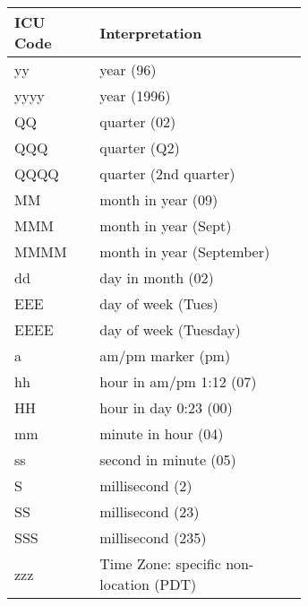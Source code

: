 \begin{table}[ht]
\centering
\bgroup
\def\arraystretch{1.5}
\begin{tabular}{|p{0.15\linewidth}| p{0.5\linewidth}|}
\hline
\textbf{ICU Code} & \textbf{Interpretation}\\ \hline

\scriptsize{yy} & \scriptsize{year (96)}\\ \hline
\scriptsize{yyyy} & \scriptsize{year (1996)}\\ \hline
    
\scriptsize{QQ} & \scriptsize{quarter (02)}\\ \hline
\scriptsize{QQQ} & \scriptsize{quarter (Q2)}\\ \hline
\scriptsize{QQQQ} & \scriptsize{quarter (2nd quarter)}\\ \hline
    
\scriptsize{MM} & \scriptsize{month in year (09)}\\ \hline
\scriptsize{MMM} & \scriptsize{month in year (Sept)}\\ \hline
\scriptsize{MMMM} & \scriptsize{month in year (September)}\\ \hline
    
\scriptsize{dd} & \scriptsize{day in month (02)}\\ \hline
    
\scriptsize{EEE} & \scriptsize{day of week (Tues)}\\ \hline
\scriptsize{EEEE} & \scriptsize{day of week (Tuesday)}\\ \hline
    
\scriptsize{a} & \scriptsize{am/pm marker (pm)}\\ \hline
    
\scriptsize{hh} & \scriptsize{hour in am/pm 1:12 (07)}\\ \hline
\scriptsize{HH} & \scriptsize{hour in day 0:23 (00)}\\ \hline
\scriptsize{mm} & \scriptsize{minute in hour (04)}\\ \hline
\scriptsize{ss} & \scriptsize{second in minute (05)}\\ \hline
    
\scriptsize{S} & \scriptsize{millisecond (2)}\\ \hline
\scriptsize{SS} & \scriptsize{millisecond (23)}\\ \hline
\scriptsize{SSS} & \scriptsize{millisecond (235)}\\ \hline

\scriptsize{zzz} & \scriptsize{Time Zone: specific non-location (PDT)}\\ \hline


\end{tabular}
\end{table}
